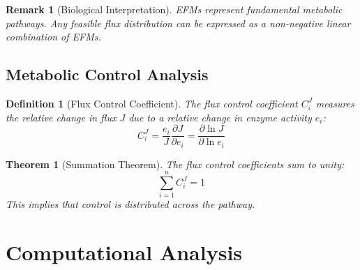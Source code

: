 \documentclass[a4paper, 11pt]{article}
\newtheorem{definition}{Definition}[section]
\newtheorem{theorem}{Theorem}[section]
\newtheorem{remark}{Remark}[section]
\begin{document}
\begin{remark}[Biological Interpretation]
EFMs represent fundamental metabolic pathways. Any feasible flux distribution can be expressed
as a non-negative linear combination of EFMs.
\end{remark}

\subsection{Metabolic Control Analysis}

\begin{definition}[Flux Control Coefficient]
The flux control coefficient $C_i^J$ measures the relative change in flux $J$ due to a relative
change in enzyme activity $e_i$:
\begin{equation}
C_i^J = \frac{e_i}{J} \frac{\partial J}{\partial e_i} = \frac{\partial \ln J}{\partial \ln e_i}
\end{equation}
\end{definition}

\begin{theorem}[Summation Theorem]
The flux control coefficients sum to unity:
\begin{equation}
\sum_{i=1}^{n} C_i^J = 1
\end{equation}
This implies that control is distributed across the pathway.
\end{theorem}

\section{Computational Analysis}
\end{document}
